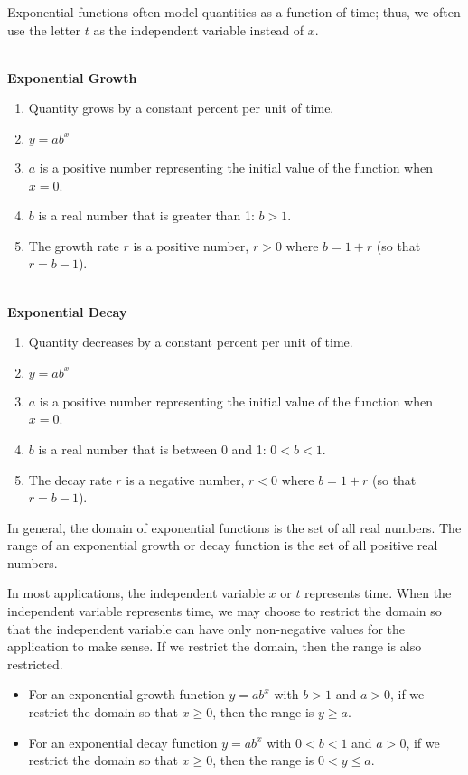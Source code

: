 Exponential functions often model quantities as a function of time; thus, we often use the letter \( t \) as the independent variable instead of \( x \).

\begin{summarybox}
    ~\\
    \textbf{Exponential Growth}
    \begin{enumerate}
        \item Quantity grows by a constant percent per unit of time.
        \item \( y = ab^x \)
        \item \( a \) is a positive number representing the initial value of the function when \( x = 0 \).
        \item \( b \) is a real number that is greater than 1: \( b > 1 \).
        \item The growth rate \( r \) is a positive number, \( r > 0 \) where \( b = 1 + r \) (so that \( r = b - 1 \)).
    \end{enumerate}
\end{summarybox}
\begin{summarybox}
    ~\\
    \textbf{Exponential Decay}
    \begin{enumerate}
        \item Quantity decreases by a constant percent per unit of time.
        \item \( y = ab^x \)
        \item \( a \) is a positive number representing the initial value of the function when \( x = 0 \).
        \item \( b \) is a real number that is between 0 and 1: \( 0 < b < 1 \).
        \item The decay rate \( r \) is a negative number, \( r < 0 \) where \( b = 1 + r \) (so that \( r = b - 1 \)).
    \end{enumerate}
\end{summarybox}

In general, the domain of exponential functions is the set of all real numbers. The range of an exponential growth or decay function is the set of all positive real numbers.

In most applications, the independent variable \( x \) or \( t \) represents time. When the independent variable represents time, we may choose to restrict the domain so that the independent variable can have only non-negative values for the application to make sense. If we restrict the domain, then the range is also restricted.
\begin{itemize}
    \item For an exponential growth function \( y = ab^x \) with \( b > 1 \) and \( a > 0 \), if we restrict the domain so that \( x \geq 0 \), then the range is \( y \geq a \).
    \item For an exponential decay function \( y = ab^x \) with \( 0 < b < 1 \) and \( a > 0 \), if we restrict the domain so that \( x \geq 0 \), then the range is \( 0 < y \leq a \).
\end{itemize}

